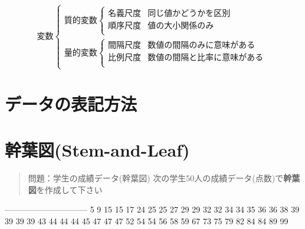 \documentclass[
]{book}
\theoremstyle{definition}
\theoremstyle{definition}
\theoremstyle{definition}
\theoremstyle{definition}
\theoremstyle{remark}
\begin{document}
\[
\text{変数}
\begin{cases}
\text{質的変数}
\begin{cases}
\text{名義尺度} & \text{同じ値かどうかを区別} \\
\text{順序尺度} & \text{値の大小関係のみ} \\
\end{cases} \\
\text{量的変数}
\begin{cases}
\text{間隔尺度} & \text{数値の間隔のみに意味がある} \\
\text{比例尺度} & \text{数値の間隔と比率に意味がある} \\
\end{cases}
\end{cases}
\]

\hypertarget{ux30c7ux30fcux30bfux306eux8868ux8a18ux65b9ux6cd5}{%
\section{データの表記方法}\label{ux30c7ux30fcux30bfux306eux8868ux8a18ux65b9ux6cd5}}

\hypertarget{ux5e79ux8449ux56f3stem-and-leaf}{%
\section{幹葉図(Stem-and-Leaf)}\label{ux5e79ux8449ux56f3stem-and-leaf}}

\begin{quote}
問題：学生の成績データ(幹葉図)
次の学生50人の成績データ(点数)で\textbf{幹葉図}を作成して下さい
\end{quote}

\textbar---\textbar---\textbar---\textbar---\textbar---\textbar---\textbar---\textbar---\textbar---\textbar---\textbar{}
\textbar{} 5 \textbar{} 9 \textbar{} 15 \textbar{} 15 \textbar{} 17 \textbar{} 24 \textbar{} 25 \textbar{} 25 \textbar{} 27 \textbar{} 29 \textbar{}
 \textbar{} 29 \textbar{} 32 \textbar{} 32 \textbar{} 34 \textbar{} 34 \textbar{} 35 \textbar{} 36 \textbar{} 36 \textbar{} 38 \textbar{}
 \textbar{} 39 \textbar{} 39 \textbar{} 39 \textbar{} 39 \textbar{} 43 \textbar{} 44 \textbar{} 44 \textbar{} 44 \textbar{} 45 \textbar{}
 \textbar{} 47 \textbar{} 47 \textbar{} 47 \textbar{} 52 \textbar{} 54 \textbar{} 54 \textbar{} 56 \textbar{} 58 \textbar{} 59 \textbar{}
 \textbar{} 67 \textbar{} 73 \textbar{} 75 \textbar{} 79 \textbar{} 82 \textbar{} 84 \textbar{} 84 \textbar{} 89 \textbar{} 99 \textbar{}
\end{document}
